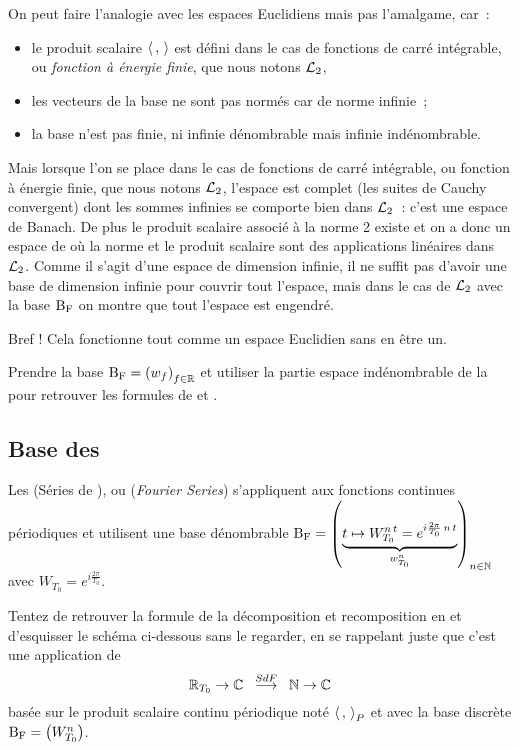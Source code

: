 
 On peut faire
l'analogie avec les espaces Euclidiens mais pas l'amalgame, car~:
\begin{itemize}
\item le produit scalaire $\langle\,,\,\rangle$ est défini  dans le cas de fonctions de carré
intégrable, ou \emph{fonction à énergie finie}, que nous notons $\mathcal{L}_{2}$,
\item les vecteurs de la base ne sont pas normés car de norme infinie~;
\item la base n'est pas finie, ni infinie dénombrable mais infinie indénombrable.
\end{itemize}

Mais lorsque l'on se place dans le cas de fonctions de carré
intégrable, ou fonction à énergie finie, que nous notons $\mathcal{L}_{2}$,
l'espace est complet (les suites de Cauchy convergent) dont les sommes
infinies se comporte bien dans $\mathcal{L}_{2}$~: c'est une espace de
Banach. De plus le produit scalaire associé à la norme 2 existe et on
a donc un espace de \Hilbert{} où la norme et le produit scalaire sont
des applications linéaires dans $\mathcal{L}_{2}$. Comme il s'agit d'une espace
de dimension infinie, il ne suffit pas d'avoir une base de dimension
infinie pour couvrir tout l'espace, mais dans le cas de $\mathcal{L}_{2}$ avec
la base $\mathrm{B_F}$ on montre que tout l'espace est engendré.

Bref ! Cela fonctionne tout comme un espace Euclidien sans en être un.

\begin{exercice}
Prendre la base $\mathrm{B_F}=\left(w_f\right)_{f\in\mathbb{R}}$ et utiliser la partie espace indénombrable de la  pour retrouver les formules de \Plancherel{} et \Parseval{}. 
\end{exercice}


\subsection{Base des \sdf{}}
Les \sdf{} (Séries de \Fourier{}), ou \FS{} (\emph{Fourier Series}) s'appliquent aux fonctions continues périodiques et   utilisent une base dénombrable $\mathrm{B_F}=\left(\underbrace{t\mapsto W_{T_0}^{n\,t}=e^{i \frac{2 \pi}{T_0}\,n\,t}}_{w_{T_0}^n}\right)_{n\in\mathbb{N}}$ avec $W_{T_0}=e^{i \frac{2 \pi}{T_0}}$.
\begin{exercice}
Tentez de retrouver la formule de la décomposition et recomposition en \sdf{} et d'esquisser le schéma ci-dessous sans le regarder, en se rappelant juste que c'est une application de $$\RT0\rightarrow\C\;\;\operateur{\sdf}\;\;\N\rightarrow\C$$  basée sur le produit scalaire continu périodique noté $\langle\,,\,{\rangle}_P$ et avec la base discrète $\mathrm{B_F}=\left(W_{T_0}^n\right)$.
\end{exercice}

